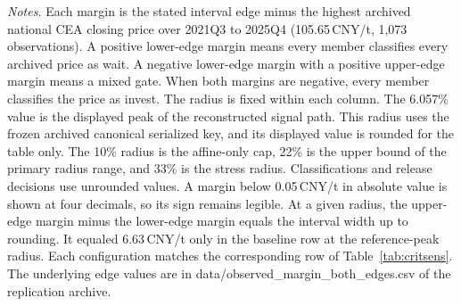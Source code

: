\begin{table}[!t]
\parbox{0.97\textwidth}{\footnotesize\emph{Notes.} Each margin is the stated interval edge minus the highest archived national CEA closing price over 2021Q3 to 2025Q4 (105.65\,CNY/t, 1,073 observations). A positive lower-edge margin means every member classifies every archived price as wait. A negative lower-edge margin with a positive upper-edge margin means a mixed gate. When both margins are negative, every member classifies the price as invest. The radius is fixed within each column. The 6.057\% value is the displayed peak of the reconstructed signal path. This radius uses the frozen archived canonical serialized key, and its displayed value is rounded for the table only. The 10\% radius is the affine-only cap, 22\% is the upper bound of the primary radius range, and 33\% is the stress radius. Classifications and release decisions use unrounded values. A margin below 0.05\,CNY/t in absolute value is shown at four decimals, so its sign remains legible. At a given radius, the upper-edge margin minus the lower-edge margin equals the interval width up to rounding. It equaled 6.63\,CNY/t only in the baseline row at the reference-peak radius. Each configuration matches the corresponding row of Table~\ref{tab:critsens}. The underlying edge values are in data/observed\_margin\_both\_edges.csv of the replication archive.}
\end{table}
